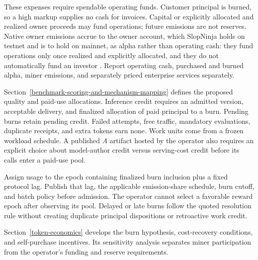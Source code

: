 These expenses require spendable operating funds. Customer principal is burned,
so a high markup supplies no cash for invoices. Capital or explicitly allocated
and realized owner proceeds may fund operations; future emissions are not
reserves. Native owner emissions accrue to the owner account, which SlopNinja
holds on testnet and is to hold on mainnet, as alpha rather than operating
cash: they fund operations only once realized and explicitly allocated, and
they do not automatically fund an investor \cite{mechanisms}. Report operating cash, purchased and burned alpha, miner
emissions, and separately priced enterprise services separately.

Section~\ref{benchmark-scoring-and-mechanism-mapping} defines the proposed
quality and paid-use allocations. Inference credit requires an admitted version,
acceptable delivery, and finalized allocation of paid principal to a burn.
Pending burns retain pending credit. Failed attempts, free traffic, mandatory
evaluations, duplicate receipts, and extra tokens earn none. Work units come
from a frozen workload schedule. A published \textit{A} artifact hosted by the
operator also requires an explicit choice about model-author credit versus
serving-cost credit before its calls enter a paid-use pool.

Assign usage to the epoch containing finalized burn inclusion plus a fixed
protocol lag. Publish that lag, the applicable emission-share schedule,
burn cutoff, and batch policy before admission. The operator cannot select
a favorable reward epoch after observing its pool. Delayed or late burns
follow the quoted resolution rule without creating duplicate principal
dispositions or retroactive work credit.

Section~\ref{token-economics} develops the burn hypothesis, cost-recovery
conditions, and self-purchase incentives. Its sensitivity analysis separates
miner participation from the operator's funding and reserve requirements.
